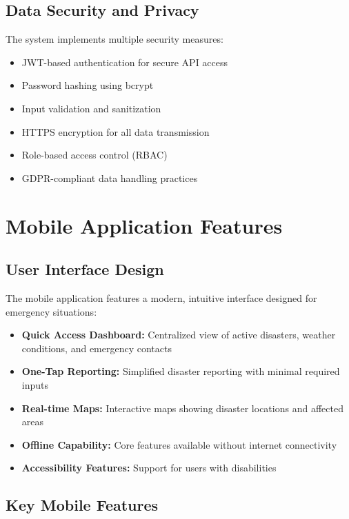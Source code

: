 \documentclass[12pt,a4paper]{article}
\begin{document}
\subsection{Data Security and Privacy}

The system implements multiple security measures:
\begin{itemize}
    \item JWT-based authentication for secure API access
    \item Password hashing using bcrypt
    \item Input validation and sanitization
    \item HTTPS encryption for all data transmission
    \item Role-based access control (RBAC)
    \item GDPR-compliant data handling practices
\end{itemize}

\section{Mobile Application Features}

\subsection{User Interface Design}

The mobile application features a modern, intuitive interface designed for emergency situations:

\begin{itemize}
    \item \textbf{Quick Access Dashboard:} Centralized view of active disasters, weather conditions, and emergency contacts
    \item \textbf{One-Tap Reporting:} Simplified disaster reporting with minimal required inputs
    \item \textbf{Real-time Maps:} Interactive maps showing disaster locations and affected areas
    \item \textbf{Offline Capability:} Core features available without internet connectivity
    \item \textbf{Accessibility Features:} Support for users with disabilities
\end{itemize}

\subsection{Key Mobile Features}
\end{document}
